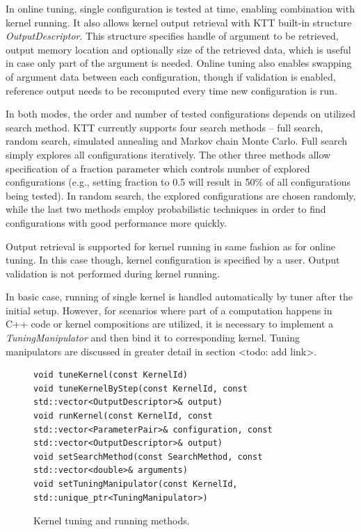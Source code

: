 \documentclass
[
    digital, %
    oneside, %
    table, %
    nolof, %
    nolot, %
    nocover %
]{fithesis3}
\begin{document}
In online tuning, single configuration is tested at time, enabling combination with kernel running. It also allows kernel output retrieval with
KTT built-in structure \textit{OutputDescriptor}. This structure specifies handle of argument to be retrieved, output memory location and optionally
size of the retrieved data, which is useful in case only part of the argument is needed. Online tuning also enables swapping of argument data between
each configuration, though if validation is enabled, reference output needs to be recomputed every time new configuration is run.

In both modes, the order and number of tested configurations depends on utilized search method. KTT currently supports four search methods -- full
search, random search, simulated annealing and Markov chain Monte Carlo. Full search simply explores all configurations iteratively. The other three
methods allow specification of a fraction parameter which controls number of explored configurations (e.g., setting fraction to 0.5 will result in
50\% of all configurations being tested). In random search, the explored configurations are chosen randomly, while the last two methods employ
probabilistic techniques in order to find configurations with good performance more quickly.

Output retrieval is supported for kernel running in same fashion as for online tuning. In this case though, kernel configuration is specified by a user.
Output validation is not performed during kernel running.

In basic case, running of single kernel is handled automatically by tuner after the initial setup. However, for scenarios where part of a computation
happens in C++ code or kernel compositions are utilized, it is necessary to implement a \textit{TuningManipulator} and then bind it to corresponding kernel.
Tuning manipulators are discussed in greater detail in section <todo: add link>.

\begin{figure}
\begin{lstlisting}
void tuneKernel(const KernelId)
void tuneKernelByStep(const KernelId, const std::vector<OutputDescriptor>& output)
void runKernel(const KernelId, const std::vector<ParameterPair>& configuration, const std::vector<OutputDescriptor>& output)
void setSearchMethod(const SearchMethod, const std::vector<double>& arguments)
void setTuningManipulator(const KernelId, std::unique_ptr<TuningManipulator>)
\end{lstlisting}
\caption{Kernel tuning and running methods.}
\label{ktt-tuning-methods}
\end{figure}
\end{document}

